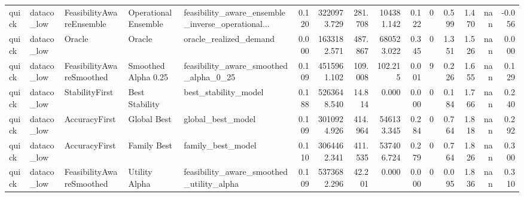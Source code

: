 \begin{table}
{\begin{tabular}{lllllrrrrrrrrrr}
   quick &     dataco\_low &  FeasibilityAwareEnsemble &  Operational Ensemble &  feasibility\_aware\_ensemble\_inverse\_operational... & 0.120 &     3220973.729 &              281.708 &         104381.142 &                     0.122 &                   0 &                       0.599 &                  1.470 &               nan &                 -0.056 \\
   quick &     dataco\_low &                    Oracle &                Oracle &                             oracle\_realized\_demand & 0.000 &     1633182.571 &              487.867 &         680523.022 &                     0.345 &                   0 &                       1.351 &                  1.526 &               nan &                  0.000 \\
   quick &     dataco\_low &  FeasibilityAwareSmoothed &   Smoothed Alpha 0.25 &              feasibility\_aware\_smoothed\_alpha\_0\_25 & 0.109 &     4515961.102 &              109.008 &            102.215 &                     0.001 &                   9 &                       0.226 &                  1.655 &               nan &                  0.129 \\
   quick &     dataco\_low &            StabilityFirst &        Best Stability &                               best\_stability\_model & 0.188 &     5263648.540 &               14.814 &              0.000 &                     0.000 &                   0 &                       0.184 &                  1.766 &               nan &                  0.240 \\
   quick &     dataco\_low &             AccuracyFirst &           Global Best &                                  global\_best\_model & 0.109 &     3010924.926 &              414.964 &         546133.345 &                     0.284 &                   0 &                       0.764 &                  1.818 &               nan &                  0.292 \\
   quick &     dataco\_low &             AccuracyFirst &           Family Best &                                  family\_best\_model & 0.110 &     3064462.341 &              411.535 &         537406.724 &                     0.279 &                   0 &                       0.764 &                  1.826 &               nan &                  0.300 \\
   quick &     dataco\_low &  FeasibilityAwareSmoothed &         Utility Alpha &           feasibility\_aware\_smoothed\_utility\_alpha & 0.109 &     5373682.296 &               42.201 &              0.000 &                     0.000 &                   0 &                       0.095 &                  1.836 &               nan &                  0.310 \\

\end{tabular}}
\end{table}
